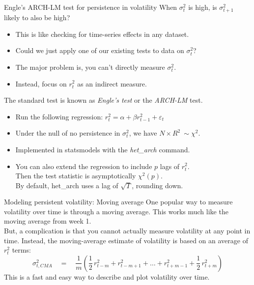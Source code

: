 \documentclass[t,12pt]{beamer}
\begin{document}
\begin{frame}[c]{Engle's ARCH-LM test for persistence in volatility}
When $\sigma_t^2$ is high, is $\sigma_{t+1}^2$ likely to also be high?
\begin{itemize}
\item This is like checking for time-series effects in any dataset.
\item Could we just apply one of our existing tests to data on $\sigma_t^2$?
\item The major problem is, you can't directly measure $\sigma_t^2$.
\item Instead, focus on $r_t^2$ as an indirect measure.
\end{itemize}
\medskip
The standard test is known as \emph{Engle's test} or the \emph{ARCH-LM} test.
\begin{itemize}
\item Run the following regression: $r_t^2 = \alpha + \beta r_{t-1}^2 + \varepsilon_t$
\item Under the null of no persistence in $\sigma_t^2$, we have $N \times R^2 ~ \sim \chi^2$.
\item Implemented in statsmodels with the \emph{het\_arch} command.
\item You can also extend the regression to include $p$ lags of $r_t^2$.
\\ Then the test statistic is asymptotically $\chi^2(p)$.
\\ By default, het\_arch uses a lag of $\sqrt{T}$, rounding down. %
\end{itemize}
\end{frame}

\begin{frame}[c]{Modeling persistent volatility: Moving average}
One popular way to measure volatility over time is through a moving average.
This works much like the moving average from week 1.
\\ \bigskip
But, a complication is that you cannot actually measure volatility at any point in time.
Instead, the moving-average estimate of volatility is based on an average of $r_t^2$ terms:
$$
\sigma_{t,CMA}^2 \quad = \quad \frac{1}{m} \left( \frac{1}{2} \, r_{t-m}^2 + r_{t-m+1}^2 + \dots + r_{t+m-1}^2 + \frac{1}{2} \, r_{t+m}^2 \right)
$$
This is a fast and easy way to describe and plot volatility over time.
\end{frame}
\end{document}
